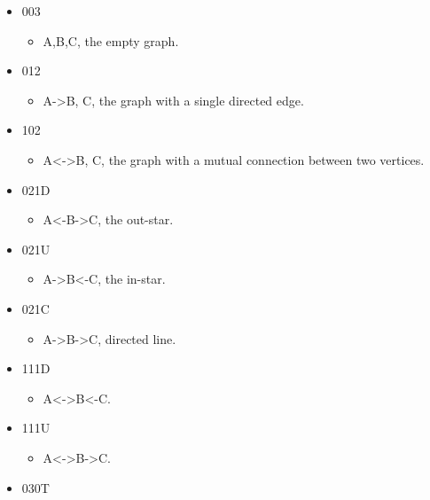 \documentclass[]{article}
\providecommand{\tightlist}{%
  \setlength{\itemsep}{0pt}\setlength{\parskip}{0pt}}
\begin{document}
\begin{itemize}
\tightlist
\item
  003

  \begin{itemize}
  \tightlist
  \item
    A,B,C, the empty graph.
  \end{itemize}
\item
  012

  \begin{itemize}
  \tightlist
  \item
    A-\textgreater{}B, C, the graph with a single directed edge.
  \end{itemize}
\item
  102

  \begin{itemize}
  \tightlist
  \item
    A\textless{}-\textgreater{}B, C, the graph with a mutual connection
    between two vertices.
  \end{itemize}
\item
  021D

  \begin{itemize}
  \tightlist
  \item
    A\textless{}-B-\textgreater{}C, the out-star.
  \end{itemize}
\item
  021U

  \begin{itemize}
  \tightlist
  \item
    A-\textgreater{}B\textless{}-C, the in-star.
  \end{itemize}
\item
  021C

  \begin{itemize}
  \tightlist
  \item
    A-\textgreater{}B-\textgreater{}C, directed line.
  \end{itemize}
\item
  111D

  \begin{itemize}
  \tightlist
  \item
    A\textless{}-\textgreater{}B\textless{}-C.
  \end{itemize}
\item
  111U

  \begin{itemize}
  \tightlist
  \item
    A\textless{}-\textgreater{}B-\textgreater{}C.
  \end{itemize}
\item
  030T


\end{itemize}
\end{document}
